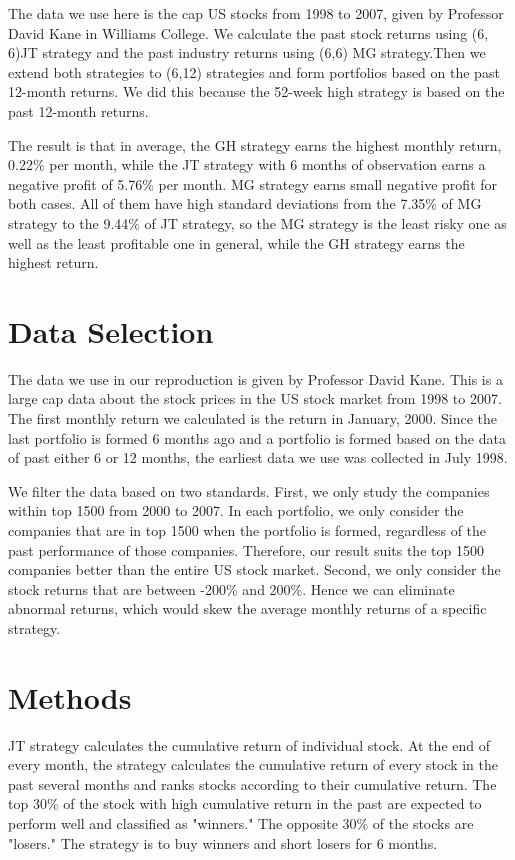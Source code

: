 \documentclass{article}
\begin{document}
The data we use here is the cap US stocks from 1998 to 2007, given by Professor David Kane in Williams College. We calculate the past stock returns using (6, 6)JT strategy and the past industry returns using (6,6) MG strategy.Then we extend both strategies to (6,12) strategies and form portfolios based on the past 12-month returns. We did this because the 52-week high strategy is based on the past 12-month returns.

The result is that in average, the GH strategy earns the highest monthly return, 0.22\% per month, while the JT strategy with 6 months of observation earns a negative profit of 5.76\% per month. MG strategy earns small negative profit for both cases. All of them have high standard deviations from the 7.35\% of MG strategy to the 9.44\% of JT strategy, so the MG strategy is the least risky one as well as the least profitable one in general, while the GH strategy earns the highest return.



\pagebreak

\section{Data Selection}

The data we use in our reproduction is given by Professor David Kane. This is a large cap data about the stock prices in the US stock market from 1998 to 2007. The first monthly return we calculated is the return in January, 2000. Since the last portfolio is formed 6 months ago and a portfolio is formed based on the data of past either 6 or 12 months, the earliest data we use was collected in July 1998. 

We filter the data based on two standards. First, we only study the companies within top 1500 from 2000 to 2007. In each portfolio, we only consider the companies that are in top 1500 when the portfolio is formed, regardless of the past performance of those companies. Therefore, our result suits the top 1500 companies better than the entire US stock market. Second, we only consider the stock returns that are between -200\% and 200\%. Hence we can eliminate abnormal returns, which would skew the average monthly returns of a specific strategy.


\section {Methods}


JT strategy calculates the cumulative return of individual stock. At the end of every month, the strategy calculates the cumulative return of every stock in the past several months and ranks stocks according to their cumulative return. The top 30\% of the stock with high cumulative return in the past are expected to perform well and classified as "winners." The opposite 30\% of the stocks are "losers." The strategy is to buy winners and short losers for 6 months. 
\end{document}
